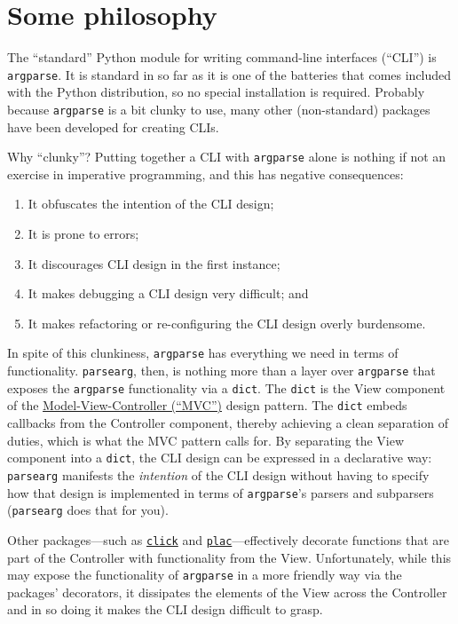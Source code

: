 \documentclass[10pt]{amsart}
\numberwithin{equation}{section}
\begin{document}
\newpage
\section{Some philosophy}
\label{sec:org33b3fe7}
The ``standard'' Python module for writing command-line interfaces (``CLI'') 
is \texttt{argparse}. It is standard in so far as it is one of the batteries 
that comes included with the Python distribution, so no special 
installation is required. 
Probably because \texttt{argparse} is a bit clunky to use,
many other (non-standard) packages have been developed for creating CLIs.

Why ``clunky''? Putting together a CLI with \texttt{argparse}
alone is nothing if not an exercise in imperative programming, and this
has negative consequences:

\begin{enumerate}
\item It obfuscates the intention of the CLI design;
\item It is prone to errors;
\item It discourages CLI design in the first instance;
\item It makes debugging a CLI design very difficult; and
\item It makes refactoring or re-configuring the CLI design overly burdensome.
\end{enumerate}

In spite of this clunkiness, \texttt{argparse} has everything we need in 
terms of functionality. \texttt{parsearg}, then, is nothing more than a layer
over \texttt{argparse} that exposes the \texttt{argparse} functionality via a \texttt{dict}.
The \texttt{dict} is the View component of the 
\href{https://en.wikipedia.org/wiki/Model\%E2\%80\%93view\%E2\%80\%93controller}{Model-View-Controller (``MVC'')}
design pattern. The \texttt{dict} embeds callbacks from the Controller component,
thereby achieving a clean separation of duties, which is what the MVC pattern
calls for. By separating the View component into a \texttt{dict}, the CLI design
can be expressed in a declarative way: \texttt{parsearg} manifests the \emph{intention}
of the CLI design without having to specify how that design is implemented
in terms of \texttt{argparse}'s parsers and subparsers (\texttt{parsearg} does that
for you).

Other packages---such as \href{https://click.palletsprojects.com}{\texttt{click}} and \href{https://micheles.github.io/plac/}{\texttt{plac}}---effectively
decorate functions that are part of the Controller with functionality
from the View. Unfortunately, while this may 
expose the functionality of \texttt{argparse} in a more friendly way
via the packages' decorators, it dissipates the elements of the View 
across the Controller and in so doing it makes the CLI design difficult to grasp.
\end{document}
